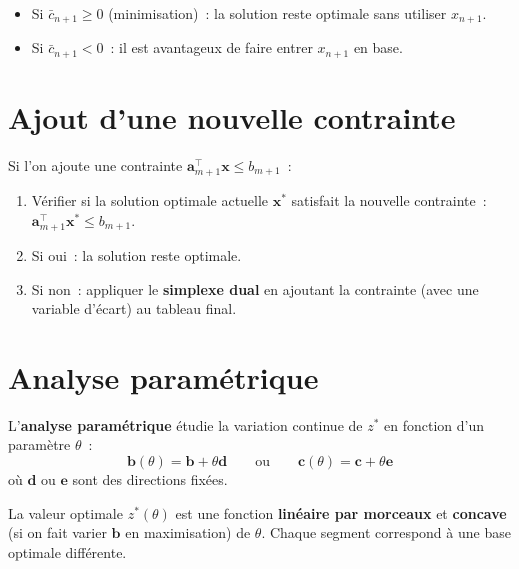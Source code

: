 \begin{itemize}
  \item Si $\bar{c}_{n+1} \ge 0$ (minimisation)~: la solution reste
        optimale sans utiliser $x_{n+1}$.
  \item Si $\bar{c}_{n+1} < 0$~: il est avantageux de faire entrer
        $x_{n+1}$ en base.
\end{itemize}

\section{Ajout d'une nouvelle contrainte}

Si l'on ajoute une contrainte $\mathbf{a}_{m+1}^\top \mathbf{x} \le b_{m+1}$~:
\begin{enumerate}
  \item V\'erifier si la solution optimale actuelle $\mathbf{x}^*$ satisfait
        la nouvelle contrainte~: $\mathbf{a}_{m+1}^\top \mathbf{x}^* \le b_{m+1}$.
  \item Si oui~: la solution reste optimale.
  \item Si non~: appliquer le \textbf{simplexe dual} en ajoutant la contrainte
        (avec une variable d'\'ecart) au tableau final.
\end{enumerate}

\section{Analyse param\'etrique}

\begin{definition}
L'\textbf{analyse param\'etrique} \'etudie la variation continue de $z^*$
en fonction d'un param\`etre $\theta$~:
\[
  \mathbf{b}(\theta) = \mathbf{b} + \theta \mathbf{d}
  \qquad \text{ou} \qquad
  \mathbf{c}(\theta) = \mathbf{c} + \theta \mathbf{e}
\]
o\`u $\mathbf{d}$ ou $\mathbf{e}$ sont des directions fix\'ees.
\end{definition}

\begin{theoreme}
La valeur optimale $z^*(\theta)$ est une fonction \textbf{lin\'eaire par
morceaux} et \textbf{concave} (si on fait varier $\mathbf{b}$ en
maximisation) de $\theta$.  Chaque segment correspond \`a une base optimale
diff\'erente.
\end{theoreme}

\begin{center}
\end{center}

